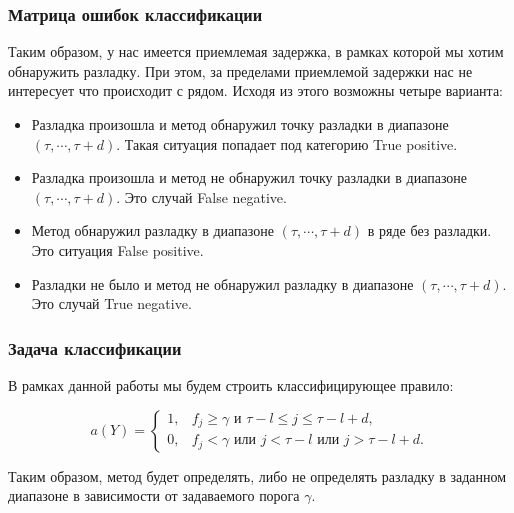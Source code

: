 \documentclass[intlimits, 9pt, unicode]{beamer}
\begin{document}
\begin{frame}
    \frametitle{Матрица ошибок классификации}

Таким образом, у нас имеется приемлемая задержка, в рамках которой мы хотим обнаружить разладку. При этом, за пределами приемлемой задержки нас не интересует что происходит с рядом.
Исходя из этого возможны четыре варианта:
\begin{itemize}
	\item Разладка произошла и метод обнаружил точку разладки в диапазоне $(\tau, \cdots, \tau+d)$. Такая ситуация попадает под категорию True positive.
	\item Разладка произошла и метод не обнаружил точку разладки в диапазоне $(\tau, \cdots, \tau+d)$. Это случай False negative.
	\item Метод обнаружил разладку в диапазоне $(\tau, \cdots, \tau+d)$ в ряде без разладки. Это ситуация False positive.
	\item Разладки не было и метод не обнаружил разладку в диапазоне $(\tau, \cdots, \tau+d)$. Это случай True negative.
\end{itemize}

\end{frame}


\begin{frame}
    \frametitle{Задача классификации}

В рамках данной работы мы будем строить классифицирующее правило:

\begin{equation*}
a(Y) = 
	\begin{cases}
		1, & f_j \geq \gamma \text{ и } \tau-l \leq j \leq \tau-l+d, \\
		0, & f_j < \gamma \text{ или }  j < \tau-l \text{ или }  j > \tau-l+d.
	\end{cases}
\end{equation*}

Таким образом, метод будет определять, либо не определять разладку в заданном диапазоне в зависимости от задаваемого порога $\gamma$.

\end{frame}
\end{document}

